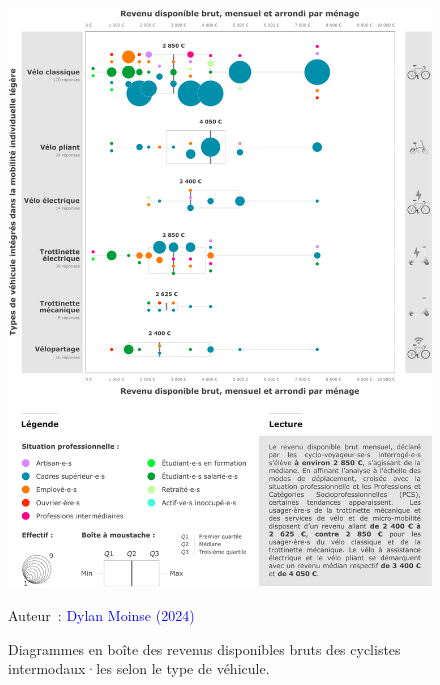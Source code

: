 \begin{refsegment}
    \begin{figure}[h!]\vspace*{4pt}
        \caption{Diagrammes en boîte des revenus disponibles bruts des cyclistes intermodaux·les selon le type de véhicule.}
        \label{fig-chap4:revenus}
        \centerline{\includegraphics[width=1\columnwidth]{src/Figures/Chap-4/FR_Revenus.pdf}}
        \vspace{5pt}
        \begin{flushright}\scriptsize{
        Auteur~: \textcolor{blue}{Dylan Moinse (2024)}
        }\end{flushright}
    \end{figure}


\end{refsegment}
